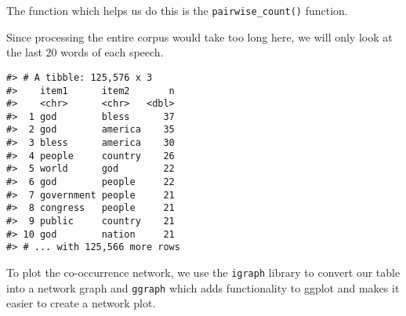 \documentclass[]{book}
\newenvironment{Shaded}{\begin{snugshade}}{\end{snugshade}}
\newcommand{\CommentTok}[1]{\textcolor[rgb]{0.56,0.35,0.01}{\textit{#1}}}
\newcommand{\DataTypeTok}[1]{\textcolor[rgb]{0.13,0.29,0.53}{#1}}
\newcommand{\DecValTok}[1]{\textcolor[rgb]{0.00,0.00,0.81}{#1}}
\newcommand{\KeywordTok}[1]{\textcolor[rgb]{0.13,0.29,0.53}{\textbf{#1}}}
\newcommand{\NormalTok}[1]{#1}
\newcommand{\OperatorTok}[1]{\textcolor[rgb]{0.81,0.36,0.00}{\textbf{#1}}}
\newcommand{\OtherTok}[1]{\textcolor[rgb]{0.56,0.35,0.01}{#1}}
\newcommand{\StringTok}[1]{\textcolor[rgb]{0.31,0.60,0.02}{#1}}
\begin{document}
The function which helps us do this is the \texttt{pairwise\_count()} function.

Since processing the entire corpus would take too long here, we will only look at the last 20 words of each speech.

\begin{Shaded}
\end{Shaded}

\begin{verbatim}
#> # A tibble: 125,576 x 3
#>    item1      item2       n
#>    <chr>      <chr>   <dbl>
#>  1 god        bless      37
#>  2 god        america    35
#>  3 bless      america    30
#>  4 people     country    26
#>  5 world      god        22
#>  6 god        people     22
#>  7 government people     21
#>  8 congress   people     21
#>  9 public     country    21
#> 10 god        nation     21
#> # ... with 125,566 more rows
\end{verbatim}

To plot the co-occurrence network, we use the \texttt{igraph} library to convert our table into a network graph and \texttt{ggraph} which adds functionality to ggplot and makes it easier to create a network plot.
\end{document}
